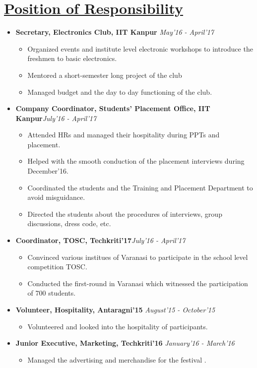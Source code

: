 \documentclass{article}
\begin{document}
\section*{\underline{Position of Responsibility}}
\begin{itemize}
\item \textbf{Secretary, Electronics Club, IIT Kanpur} \hfill\textit{May'16 - April'17}
\begin{itemize}
\item Organized events and institute level electronic workshops to introduce the freshmen  to basic electronics. 
\item Mentored a short-semester long project of the club
\item Managed budget and the day to day functioning of the club.
\end{itemize}
\item \textbf{Company Coordinator, Students' Placement Office, IIT Kanpur}\hfill\textit{July'16 - April'17}
\begin{itemize}
\item Attended HRs and managed their hospitality during PPTs and placement.
\item Helped with the smooth conduction of the placement interviews during December'16.
\item Coordinated the students and the Training and Placement Department to avoid misguidance.
\item Directed the students about the procedures of interviews, group discussions, dress code, etc.
\end{itemize}
\item \textbf{Coordinator, TOSC, Techkriti'17}\hfill\textit{July'16 - April'17}
\begin{itemize}
\item Convinced various institues of Varanasi to participate in the school level competition TOSC.
\item Conducted the first-round in Varanasi which witnessed the participation of 700 students.
\end{itemize}
\item \textbf{Volunteer, Hospitality, Antaragni'15} \hfill\textit{August'15 - October'15}
\begin{itemize}
\item Volunteered and looked into the hospitality of participants.
\end{itemize}
\item \textbf{Junior Executive, Marketing, Techkriti'16} \hfill\textit{January'16 - March'16}
\begin{itemize}
\item Managed the advertising and merchandise for the festival . 
\end{itemize}
\end{itemize}
\end{document}
